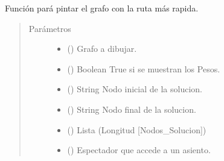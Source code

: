 \documentclass[letterpaper,10pt,spanish]{sphinxmanual}
\begin{document}
\begin{fulllineitems}
\label{\detokenize{Funciones:Funciones.DibujarGrafoMasRapida}}
\sphinxAtStartPar
Función pará pintar el grafo con la ruta más rapida.
\begin{quote}\begin{description}
\item[{Parámetros}] \leavevmode\begin{itemize}
\item {} 
\sphinxAtStartPar
{} () \textendash{} Grafo a dibujar.

\item {} 
\sphinxAtStartPar
{} () \textendash{} Boolean \sphinxhyphen{} True si se muestran los Pesos.

\item {} 
\sphinxAtStartPar
{} () \textendash{} String \sphinxhyphen{} Nodo inicial de la solucion.

\item {} 
\sphinxAtStartPar
{} () \textendash{} String \sphinxhyphen{} Nodo final de la solucion.

\item {} 
\sphinxAtStartPar
{} () \textendash{} Lista \sphinxhyphen{} (Longitud {[}Nodos\_Solucion{]})

\item {} 
\sphinxAtStartPar
{} ({\hyperref[\detokenize{Clases:Clases.Espectador}]{}}) \textendash{} Espectador que accede a un asiento.


\end{itemize}
\end{description}
\end{quote}
\end{fulllineitems}
\end{document}
